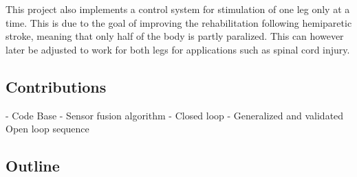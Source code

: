 This project also implements a control system for stimulation of one leg only at a time. This is due to the goal of improving the rehabilitation following hemiparetic stroke, meaning that only half of the body is partly paralized. This can however later be adjusted to work for both legs for applications such as spinal cord injury.



\subsection{Contributions}
- Code Base
- Sensor fusion algorithm
- Closed loop
- Generalized and validated Open loop sequence


\subsection{Outline}









